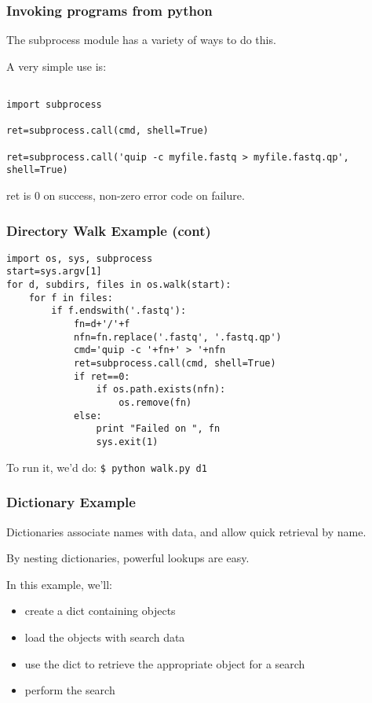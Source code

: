 \documentclass[10pt]{beamer}
\newcommand\smallfont{\fontsize{8pt}{7.2}\selectfont}
\begin{document}
\begin{frame}[fragile]
\frametitle{Invoking programs from python}

The subprocess module has a variety of ways to do this.  
\vspace{2mm}

A very simple use is:

\smallfont
\begin{verbatim}

import subprocess

ret=subprocess.call(cmd, shell=True)

ret=subprocess.call('quip -c myfile.fastq > myfile.fastq.qp', shell=True)
\end{verbatim}

ret is 0 on success, non-zero error code on failure.

\end{frame}
\begin{frame}[fragile]
\frametitle{Directory Walk Example (cont)}

\smallfont
\begin{verbatim}
import os, sys, subprocess
start=sys.argv[1]
for d, subdirs, files in os.walk(start):
    for f in files:
        if f.endswith('.fastq'):
            fn=d+'/'+f
            nfn=fn.replace('.fastq', '.fastq.qp')
            cmd='quip -c '+fn+' > '+nfn
            ret=subprocess.call(cmd, shell=True)
            if ret==0:
                if os.path.exists(nfn):
                    os.remove(fn)
            else:
                print "Failed on ", fn
                sys.exit(1)
\end{verbatim}

To run it, we'd do: \verb+$ python walk.py d1+

\end{frame}

\begin{frame}[fragile]
\frametitle{Dictionary Example}

Dictionaries associate names with data, and allow quick retrieval by name.
\vspace{2mm}

By nesting dictionaries, powerful lookups are easy.
\vspace{2mm}

In this example, we'll:
\begin{itemize}
\item create a dict containing objects
\item load the objects with search data
\item use the dict to retrieve the appropriate object for a search
\item perform the search
\end{itemize}

\end{frame}
\end{document}
